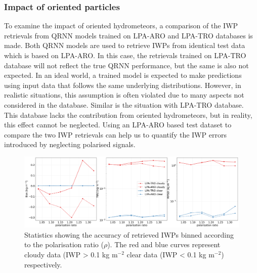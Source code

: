 \documentclass[amt, manuscript]{copernicus}
\begin{document}
\subsubsection{Impact of oriented particles}
\label{sec:impact_retrieval}
%
To examine the impact of oriented hydrometeors, a comparison of the IWP retrievals from QRNN models trained on LPA-ARO and LPA-TRO databases is made. Both QRNN models are used to retrieve IWPs from identical test data which is based on LPA-ARO. In this case, the retrievals trained on LPA-TRO database will not reflect the true QRNN performance, but the same is also not expected. In an ideal world, a trained model is expected to make predictions using input data that follows the same underlying distributions. However, in realistic situations, this assumption is often violated due to many aspects not considered in the database. Similar is the situation with LPA-TRO database. This database lacks the contribution from oriented hydrometeors, but in reality, this effect cannot be neglected. Using an LPA-ARO based test dataset to compare the two IWP retrievals can help us to quantify the IWP errors introduced by neglecting polarised signals. 


\begin{figure}[t]
	\includegraphics[width=12cm]{Figures/statistics_cloudyclear.pdf}
	\caption{Statistics showing the accuracy of retrieved IWPs
		binned according to the polarisation ratio ($\rho$). The red and blue curves represent cloudy data (IWP > 0.1\,\,kg m$^{-2}$
		clear data (IWP < 0.1\,\,kg m$^{-2}$) respectively.}
	\label{fig:clear_cloudy}
\end{figure}

\end{document}

